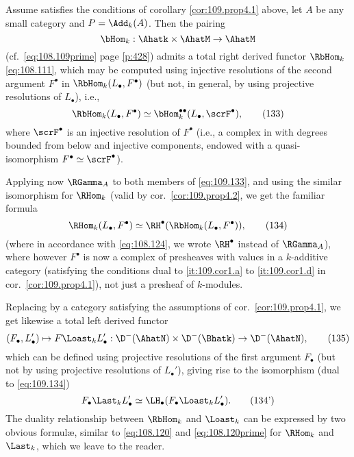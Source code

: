 \begin{corollarynum}\label{cor:109.prop4.2}
  Assume \scrM{} satisfies the conditions of corollary
  \ref{cor:109.prop4.1} above, let $A$ be any small category and
  $P=\Add_k(A)$. Then the pairing
  \[\bHom_k:\Ahatk\times\AhatM\to\AhatM\]
  \textup(cf.\ \eqref{eq:108.109prime} page \ref{p:428}\textup) admits
  a total right derived functor $\RbHom_k$
  \eqref{eq:108.111}, which may be computed using
  injective resolutions of the second argument $F^\bullet$ in
  $\RbHom_k(L_\bullet,F^\bullet)$ \textup(but not, in general, by
  using projective resolutions of $L_\bullet$\textup), i.e.,
  \begin{equation}
    \label{eq:109.133}
    \RbHom_k(L_\bullet,F^\bullet) \simeq
    \bHom_k^{\bullet\bullet}(L_\bullet,\scrF^\bullet),\tag{133}
  \end{equation}
  where $\scrF^\bullet$ is an injective resolution of $F^\bullet$
  \textup(i.e., a complex in \AhatM{} with degrees bounded from below
  and injective components, endowed with a quasi-isomorphism
  $F^\bullet\simeq\scrF^\bullet$\textup).
\end{corollarynum}

Applying now $\RGamma_A$ to both members of \eqref{eq:109.133}, and
using the similar isomorphism for $\RHom_k$ (valid by cor.\
\ref{cor:109.prop4.2}, we get the familiar formula
\begin{equation}
  \label{eq:109.134}
  \RHom_k(L_\bullet,F^\bullet)\simeq\RH^\bullet(\RbHom_k(L_\bullet,F^\bullet)),\tag{134}
\end{equation}
(where in accordance with \eqref{eq:108.124}, we wrote $\RH^\bullet$
instead of $\RGamma_A$), where however $F^\bullet$ is now a complex of
presheaves with values in a $k$-additive category \scrM{} (satisfying
the conditions dual to \ref{it:109.cor1.a} to \ref{it:109.cor1.d} in
cor.\ \ref{cor:109.prop4.1}), not just a presheaf of $k$-modules.

Replacing \scrM{} by a category \scrN{} satisfying the assumptions of
cor.\ \ref{cor:109.prop4.1}, we get likewise a total left derived
functor
\begin{equation}
  \label{eq:109.135}
  (F_\bullet,L_\bullet')\mapsto F\Loast_k L_\bullet' : \D^-(\AhatN)
  \times \D^-(\Bhatk) \to \D^-(\AhatN),\tag{135}
\end{equation}
which can be defined using projective resolutions of the first
argument $F_\bullet$ (but not by using projective resolutions of
$L_\bullet'$), giving rise to the isomorphism (dual to
\eqref{eq:109.134})
\begin{equation}
  \label{eq:109.134prime}
  F_\bullet \Last_k L_\bullet' \simeq \LH_\bullet(F_\bullet \Loast_k
  L_\bullet'). \tag{134'}
\end{equation}
The duality relationship between $\RbHom_k$ and $\Loast_k$ can be
expressed by two obvious formulæ, similar to \eqref{eq:108.120} and
\eqref{eq:108.120prime} for $\RHom_k$ and $\Last_k$, which we leave to
the reader.

